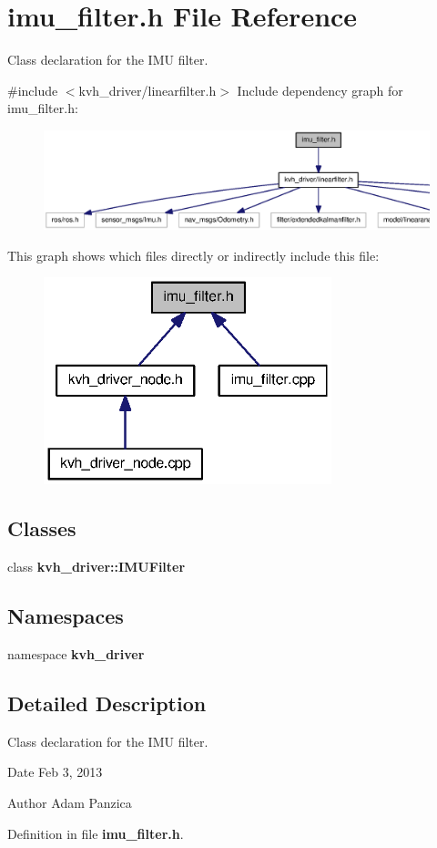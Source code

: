 \section{imu\-\_\-filter.\-h \-File \-Reference}
\label{imu__filter_8h}


\-Class declaration for the \-I\-M\-U filter.  


{\ttfamily \#include $<$kvh\-\_\-driver/linearfilter.\-h$>$}\*
\-Include dependency graph for imu\-\_\-filter.\-h\-:
\nopagebreak
\begin{figure}[H]
\begin{center}
\leavevmode
\includegraphics[width=350pt]{imu__filter_8h__incl}
\end{center}
\end{figure}
\-This graph shows which files directly or indirectly include this file\-:\nopagebreak
\begin{figure}[H]
\begin{center}
\leavevmode
\includegraphics[width=237pt]{imu__filter_8h__dep__incl}
\end{center}
\end{figure}
\subsection*{\-Classes}
\begin{DoxyCompactItemize}
\item 
class {\bf kvh\-\_\-driver\-::\-I\-M\-U\-Filter}
\end{DoxyCompactItemize}
\subsection*{\-Namespaces}
\begin{DoxyCompactItemize}
\item 
namespace {\bf kvh\-\_\-driver}
\end{DoxyCompactItemize}


\subsection{\-Detailed \-Description}
\-Class declaration for the \-I\-M\-U filter. \begin{DoxyDate}{\-Date}
\-Feb 3, 2013 
\end{DoxyDate}
\begin{DoxyAuthor}{\-Author}
\-Adam \-Panzica 
\end{DoxyAuthor}


\-Definition in file {\bf imu\-\_\-filter.\-h}.

